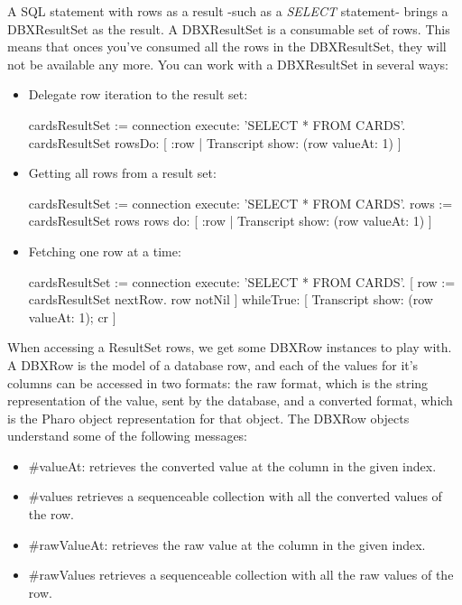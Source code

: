 \documentclass[a4paper,10pt,twoside]{book}
\begin{document}
A SQL statement with rows as a result -such as a \emph{SELECT} statement- brings a DBXResultSet as the result.  A DBXResultSet is a consumable set of rows.  This means that onces you've consumed all the rows in the DBXResultSet, they will not be available any more.  You can work with a DBXResultSet in several ways:

\begin{itemize}
\item Delegate row iteration to the result set:
\begin{code}{}
cardsResultSet := connection execute: 'SELECT * FROM CARDS'.
cardsResultSet rowsDo: [ :row | Transcript show: (row valueAt: 1) ]
\end{code}
\item Getting all rows from a result set:
\begin{code}{}
cardsResultSet := connection execute: 'SELECT * FROM CARDS'.
rows := cardsResultSet rows
rows do: [ :row | Transcript show: (row valueAt: 1) ]
\end{code}
\item Fetching one row at a time:
\begin{code}{}
cardsResultSet := connection execute: 'SELECT * FROM CARDS'.
[ row := cardsResultSet nextRow.
  row notNil ] 
    whileTrue: [ Transcript show: (row valueAt: 1); cr ]
\end{code}
\end{itemize}


When accessing a ResultSet rows, we get some DBXRow instances to play with.  A DBXRow is the model of a database row, and each of the values for it's columns can be accessed in two formats: the raw format, which is the string representation of the value, sent by the database, and a converted format, which is the Pharo object representation for that object.
The DBXRow objects understand some of the following messages:

\begin{itemize}
    \item \#valueAt: retrieves the converted value at the column in the given index.
    \item \#values retrieves a sequenceable collection with all the converted values of the row.
    \item \#rawValueAt: retrieves the raw value at the column in the given index.
    \item \#rawValues retrieves a sequenceable collection with all the raw values of the row.
\end{itemize}
\end{document}
